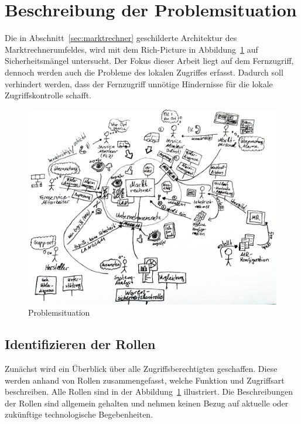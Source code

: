 \documentclass[11pt,a4paper]{report}
\begin{document}
\section{Beschreibung der Problemsituation} \label{sec:problem_situation}

Die in Abschnitt~\ref{sec:marktrechner} geschilderte Architektur des Marktrechnerumfeldes, wird mit dem Rich-Picture in Abbildung~\ref{fig:problem_situation} auf Sicherheitsmängel untersucht. Der Fokus dieser Arbeit liegt auf dem Fernzugriff, dennoch werden auch die Probleme des lokalen Zugriffes erfasst. Dadurch soll verhindert werden, dass der Fernzugriff unnötige Hindernisse für die lokale Zugriffskontrolle schafft. 

\begin{figure}[htb]
\centering
\includegraphics[scale=0.215]{images/problemsituation.jpg}
\caption{Problemsituation}
\label{fig:problem_situation}
\end{figure}

\subsection{Identifizieren der Rollen} \label{sec:roles}

Zunächst wird ein Überblick über alle Zugriffsberechtigten geschaffen. Diese werden anhand von Rollen zusammengefasst, welche Funktion und Zugriffsart beschreiben. Alle Rollen sind in der Abbildung~\ref{fig:problem_situation} illustriert. Die Beschreibungen der Rollen sind allgemein gehalten und nehmen keinen Bezug auf aktuelle oder zukünftige technologische Begebenheiten.
\end{document}

